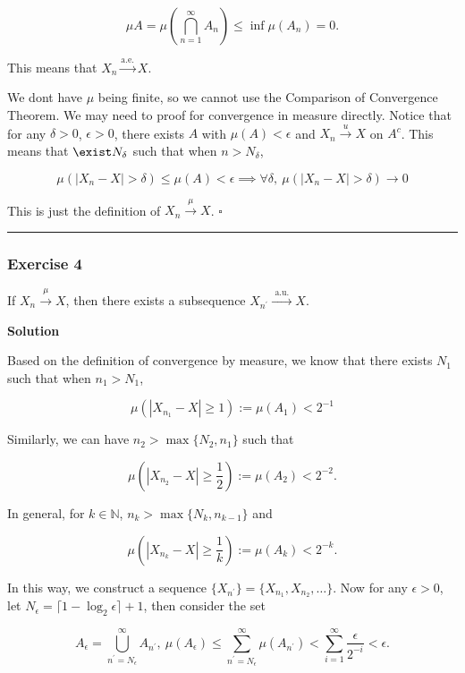 \documentclass[
]{article}
\begin{document}
\[\mu A = \mu\left( \bigcap_{n=1}^\infty A_n \right) \le \inf \mu(A_n) = 0.\]

This means that \(X_n \xrightarrow{\text{a.e.}} X\).

We don\textquotesingle t have \(\mu\) being finite, so we cannot use the
Comparison of Convergence Theorem. We may need to proof for convergence
in measure directly. Notice that for any \(\delta > 0\),
\(\epsilon > 0\), there exists \(A\) with \(\mu(A) < \epsilon\) and
\(X_n \xrightarrow{u} X\) on \(A^c\). This means that
\(\exist N_\delta\) such that when \(n > N_{\delta}\),

\[\mu\left(|X_n - X| > \delta\right) \le \mu(A) < \epsilon \implies \forall \delta,\ \mu\left(|X_n - X| > \delta\right) \to 0\]

This is just the definition of \(X_n \xrightarrow{\mu} X\). \(\square\)

\begin{center}\rule{0.5\linewidth}{0.5pt}\end{center}

\hypertarget{exercise-4-2}{%
  \subsubsection{Exercise 4}\label{exercise-4-2}}

If \(X_n \stackrel{\mu}{\longrightarrow} X\), then there exists a
subsequence
\(X_{n^{\prime}} \stackrel{\text { a.u. }}{\longrightarrow} X\).

\textbf{Solution}

Based on the definition of convergence by measure, we know that there
exists \(N_1\) such that when \(n_1 > N_1\),

\[\mu\left(|X_{n_1} - X| \ge 1 \right) := \mu(A_1) < 2^{-1}\]

Similarly, we can have \(n_2 > \max\{N_2, n_1\}\) such that

\[\mu\left(|X_{n_2} - X| \ge \frac{1}{2} \right):= \mu(A_2) < 2^{-2}.\]

In general, for \(k \in \mathbb N\), \(n_k > \max\{N_{k}, n_{k-1}\}\)
and

\[\mu\left(|X_{n_k} - X| \ge \frac{1}{k} \right):= \mu(A_k) < 2^{-k}.\]

In this way, we construct a sequence
\(\{X_{n^\prime}\} = \{X_{n_1}, X_{n_2}, \dots\}\). Now for any
\(\epsilon > 0\), let
\(N_{\epsilon} = \lceil 1 - \log_2 \epsilon\rceil + 1\), then consider
the set

\[A_{\epsilon} = \bigcup_{n^\prime=N_{\epsilon}}^\infty A_{n^\prime}, \ \mu(A_{\epsilon}) \le \sum_{n^\prime = N_\epsilon}^\infty \mu (A_{n^\prime}) < \sum_{i = 1}^\infty \frac{\epsilon}{2^{-i}} < \epsilon.\]
\end{document}
